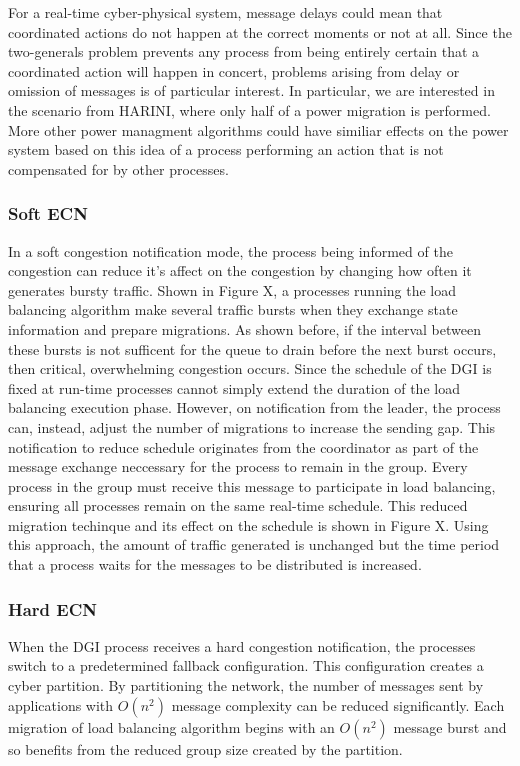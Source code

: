 For a real-time cyber-physical system, message delays could mean that coordinated actions do not happen at the correct moments or not at all.
Since the two-generals problem prevents any process from being entirely certain that a coordinated action will happen in concert, problems arising from delay or omission of messages is of particular interest.
In particular, we are interested in the scenario from HARINI, where only half of a power migration is performed.
More other power managment algorithms could have similiar effects on the power system based on this idea of a process performing an action that is not compensated for by other processes.

\subsubsection{Soft ECN}

In a soft congestion notification mode, the process being informed of the congestion can reduce it's affect on the congestion by changing how often it generates bursty traffic.
Shown in Figure X, a processes running the load balancing algorithm make several traffic bursts when they exchange state information and prepare migrations.
As shown before, if the interval between these bursts is not sufficent for the queue to drain before the next burst occurs, then critical, overwhelming congestion occurs.
Since the schedule of the DGI is fixed at run-time processes cannot simply extend the duration of the load balancing execution phase.
However, on notification from the leader, the process can, instead, adjust the number of migrations to increase the sending gap.
This notification to reduce schedule originates from the coordinator as part of the message exchange neccessary for the process to remain in the group.
Every process in the group must receive this message to participate in load balancing, ensuring all processes remain on the same real-time schedule.
This reduced migration techinque and its effect on the schedule is shown in Figure X.
Using this approach, the amount of traffic generated is unchanged but the time period that a process waits for the messages to be distributed is increased.

\subsubsection{Hard ECN}

When the DGI process receives a hard congestion notification, the processes switch to a predetermined fallback configuration.
This configuration creates a cyber partition.
By partitioning the network, the number of messages sent by applications with $O(n^2)$ message complexity can be reduced significantly.
Each migration of load balancing algorithm begins with an $O(n^2)$ message burst and so benefits from the reduced group size created by the partition.

